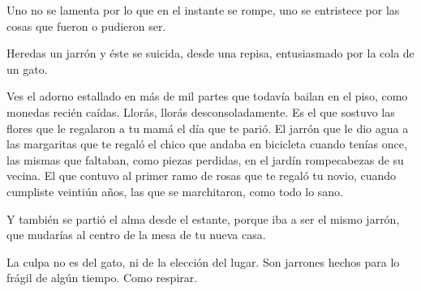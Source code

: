 
Uno no se lamenta por lo que en el instante se rompe, uno se entristece
por las cosas que fueron o pudieron ser.

Heredas un jarrón y éste se suicida, desde una repisa, entusiasmado por
la cola de un gato.

Ves el adorno estallado en más de mil partes que todavía bailan en el piso,
como monedas recién caídas. Llorás, llorás desconsoladamente. Es el que 
sostuvo las flores que le regalaron a tu mamá el día que te parió. El 
jarrón que le dio agua a las margaritas que te regaló el chico que andaba
en bicicleta cuando tenías once, las mismas que faltaban, como piezas
perdidas, en el jardín rompecabezas de su vecina. El que contuvo al primer
ramo de rosas que te regaló tu novio, cuando cumpliste veintiún años, las 
que se marchitaron, como todo lo sano.

Y también se partió el alma desde el estante, porque iba a ser el mismo
jarrón, que mudarías al centro de la mesa de tu nueva casa.

La culpa no es del gato, ni de la elección del lugar. Son jarrones hechos
para lo frágil de algún tiempo. Como respirar.

